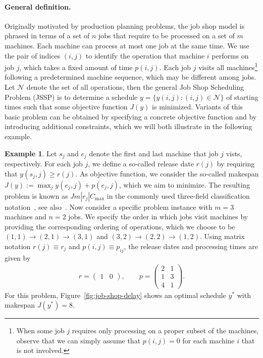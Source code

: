 \documentclass{report}
\theoremstyle{definition}
\newtheorem{eg}{Example}[chapter]
\theoremstyle{plain}
\begin{document}
\paragraph{General definition.}
Originally motivated by production planning problems, the job shop model is
phrased in terms of a set of $n$ jobs that require to be processed on a set of
$m$ machines. Each machine can process at most one job at the same time.
%
We use the pair of indices $(i,j)$ to identify the operation that machine $i$
performs on job $j$, which takes a fixed amount of time $p(i,j)$.
%
Each job $j$ visits all machines\footnote{When some job $j$ requires only processing on a proper subset of the machines, observe that we can simply
  assume that $p(i,j) = 0$ for each machine $i$ that is not involved.} following
a predetermined machine sequence, which may be different among jobs.
%
Let $\mathcal{N}$ denote the set of all operations, then the general Job Shop Scheduling
Problem (JSSP) is to determine a schedule $y = \{ y(i,j) : (i,j) \in \mathcal{N} \}$ of
starting times such that some objective function $J(y)$ is minimized.
%
Variants of this basic problem can be obtained by specifying a concrete
objective function and by introducing additional constraints, which we will both
illustrate in the following example.

\begin{eg}\label{eg:job-shop}
  Let $s_{j}$ and $e_{j}$ denote the first and last machine that job $j$ vists, respectively.
  For each job $j$, we define a so-called release date $r(j)$ by requiring that
  $y(s_{j},j) \geq r(j)$.
  As objective function, we consider the so-called makespan
  $J(y) := \max_{j} y(e_{j},j) + p(e_{j}, j)$, which we aim to minimize.
  The resulting problem is known as $Jm|r_{j}|C_{\max}$ in the commonly used
  three-field classification notation~\cite{grahamOptimizationApproximationDeterministic1979}, see also~\cite[Chapter
  2]{pinedoSchedulingTheoryAlgorithms2016}.
  Now consider a specific problem instance with $m=3$ machines and $n=2$ jobs.
  We specify the order in which jobs visit machines by providing the
  corresponding ordering of operations, which we choose to be
  $(1,1) \rightarrow (2,1) \rightarrow (3,1)$ and $(3,2) \rightarrow (2,2) \rightarrow (1,2)$. Using matrix notation
  $r(j) \equiv r_{j}$ and $p(i,j) \equiv p_{ij}$, the release dates and processing
  times are given by
  \begin{align*}
    r =
    \begin{pmatrix}
      1 & 0
    \end{pmatrix} ,
    \quad\quad
    p =
    \begin{pmatrix}
      2 & 1 \\
      1 & 3 \\
      4 & 1
    \end{pmatrix} .
  \end{align*}
  For this problem, Figure~\ref{fig:job-shop-delay} shows an optimal schedule $y^{*}$ with
  makespan $J(y^{*}) = 8$.
\end{eg}
\end{document}
